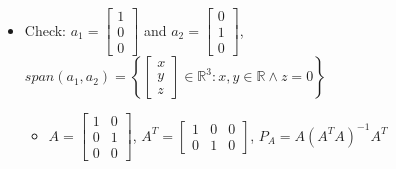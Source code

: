 \documentclass{article}
\begin{document}
\begin{itemize}
\begin{itemize}
        \item Recall $\epsilon = b - Ax \Longleftrightarrow A^T(b-Ax) = 0$
        \begin{itemize}
            \item $A^Tb - A^TAx = 0 \Rightarrow A^Tb = A^TAx$
            \item If $A^TA$ is invertible,
            \[
            x = (A^TA)^{-1} A^Tb
            \]
            \item $Ax = A(A^TA)^{-1}A^Tb$ is the orthogonal projection of $b$ onto the $span(A)$
            \item Projection matrix:
            \[
            P_A = A(A^TA)^{-1}A^T
            \]
            \begin{itemize}
                \item Properties: $P_A^2=P_a$ (idempotent) and $P_A^\top=P_A$ (symmetric)
            \end{itemize}
        \end{itemize}
    \end{itemize}
    \item Check: $a_1 = \left[ \begin{array}{c}
        1 \\ 0 \\ 0
    \end{array}\right]$ and $a_2 = \left[ \begin{array}{c}
        0 \\ 1 \\ 0
    \end{array}\right]$, $span(a_1,a_2) = \left\{ \left[ \begin{array}{c}
        x \\ y \\ z
    \end{array}\right]  \in \mathbb{R}^3 : x,y \in \mathbb{R} \wedge z =0 \right\}$
    \begin{itemize}
        \item $A = \left[ \begin{array}{cc}
            1 & 0 \\
            0 & 1 \\
            0 & 0
        \end{array}\right]$, $A^T = \left[ \begin{array}{ccc}
            1 & 0 & 0\\
            0 & 1 & 0
        \end{array}\right]$, $P_A = A(A^TA)^{-1}A^T$
    \end{itemize}

\end{itemize}
\end{document}
